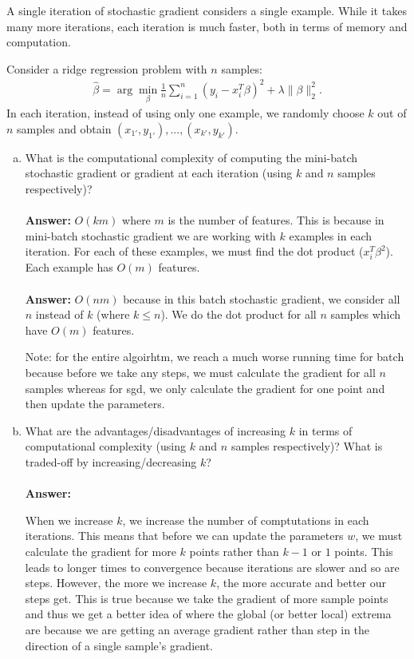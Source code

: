 \documentclass[11pt]{article}
\begin{document}
A single iteration of stochastic gradient considers a single example.
While it takes many more iterations, each iteration is much faster, both in terms of memory and computation.

Consider a ridge regression problem with $n$ samples:
\begin{align}
\hat{\beta} = \arg\min_{\beta}\frac{1}{n}\sum_{i=1}^n(y_i - x_i^T\beta)^2 + \lambda\|\beta\|_2^2.
\end{align}
In each iteration, instead of using only one example, we randomly choose $k$ out of $n$ samples and obtain $(x_{1'},y_{1'}),...,(x_{k'},y_{k'})$. 

\begin{enumerate}[(a)]
\item What is the computational complexity of computing the mini-batch stochastic gradient or gradient at each iteration (using $k$ and $n$ samples respectively)?
\\ \\
{\bf Answer: }
$O(km)$ where $m$ is the number of features. This is because in mini-batch stochastic gradient we are working with $k$ examples in each iteration. For each of these examples, we must find the dot product ($x_i^T \beta^2$). Each example has $O(m)$ features.
\\ \\
{\bf Answer: }
$O(nm)$ because in this batch stochastic gradient, we consider all $n$ instead of $k$ (where $k \leq n$). We do the dot product for all $n$ samples which have $O(m)$ features.

Note: for the entire algoirhtm, we reach a much worse running time for batch because before we take any steps, we must calculate the gradient for all $n$ samples whereas for sgd, we only calculate the gradient for one point and then update the parameters.

\item What are the advantages/disadvantages of increasing $k$ in terms of computational complexity (using $k$ and $n$ samples respectively)? What is traded-off by increasing/decreasing $k$?
\\ \\
{\bf Answer: }

When we increase $k$, we increase the number of comptutations in each iterations. This means that before we can update the parameters $w$, we must calculate the gradient for more $k$ points rather than $k-1$ or $1$ points. This leads to longer times to convergence because iterations are slower and so are steps. However, the more we increase $k$, the more accurate and better our steps get. This is true because we take the gradient of more sample points and thus we get a better idea of where the global (or better local) extrema are because we are getting an average gradient rather than step in the direction of a single sample's gradient.


\end{enumerate}
\end{document}
